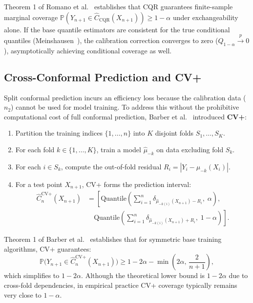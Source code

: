 \documentclass[journal]{IEEEtran}
\begin{document}
Theorem 1 of Romano et al.~\cite{romano2019} establishes that CQR guarantees finite-sample marginal coverage $\mathbb{P}(Y_{n+1} \in \hat{C}_{\text{CQR}}(X_{n+1})) \ge 1 - \alpha$ under exchangeability alone. If the base quantile estimators are consistent for the true conditional quantiles (Meinshausen~\cite{meinshausen2006}), the calibration correction converges to zero ($Q_{1-\alpha} \xrightarrow{p} 0$), asymptotically achieving conditional coverage as well.

\subsection{Cross-Conformal Prediction and CV+}
Split conformal prediction incurs an efficiency loss because the calibration data ($n_2$) cannot be used for model training. To address this without the prohibitive computational cost of full conformal prediction, Barber et al.~\cite{barber2021} introduced \textbf{CV+}:
\begin{enumerate}
    \item Partition the training indices $\{1, \dots, n\}$ into $K$ disjoint folds $S_1, \dots, S_K$.
    \item For each fold $k \in \{1, \dots, K\}$, train a model $\hat{\mu}_{-k}$ on data excluding fold $S_k$.
    \item For each $i \in S_k$, compute the out-of-fold residual $R_i = |Y_i - \hat{\mu}_{-k}(X_i)|$.
    \item For a test point $X_{n+1}$, CV+ forms the prediction interval:
    \begin{align}
    \hat{C}_{n}^{\text{CV+}}(X_{n+1}) &= \left[ \text{Quantile}\left( \sum_{i=1}^n \delta_{\hat{\mu}_{-k(i)}(X_{n+1}) - R_i}, \; \alpha \right), \right. \nonumber\\
    &\quad \left. \text{Quantile}\left( \sum_{i=1}^n \delta_{\hat{\mu}_{-k(i)}(X_{n+1}) + R_i}, \; 1 - \alpha \right) \right].
    \end{align}
\end{enumerate}

Theorem 1 of Barber et al.~\cite{barber2021} establishes that for symmetric base training algorithms, CV+ guarantees:
\begin{equation}
\mathbb{P}\big(Y_{n+1} \in \hat{C}_{n}^{\text{CV+}}(X_{n+1})\big) \ge 1 - 2\alpha - \min\left(2\alpha, \, \frac{2}{n + 1}\right),
\end{equation}
which simplifies to $1 - 2\alpha$. Although the theoretical lower bound is $1 - 2\alpha$ due to cross-fold dependencies, in empirical practice CV+ coverage typically remains very close to $1 - \alpha$.
\end{document}
